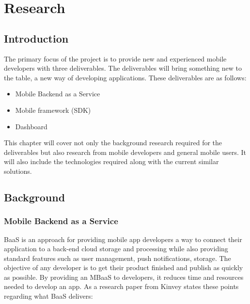 \chapter{Research}

\label{ch:background}

\section{Introduction}

The primary focus of the project is to provide new and experienced mobile developers with three deliverables. The deliverables will bring something new to the table, a new way of developing applications. These deliverables are as follows:

\begin{itemize}
  \item Mobile Backend as a Service
  \item Mobile framework (SDK)
  \item Dashboard
\end{itemize}

This chapter will cover not only the background research required for the deliverables but also research from mobile developers and general mobile users. It will also include the technologies required along with the current similar solutions.

\section{Background}

\subsection{Mobile Backend as a Service}

BaaS is an approach for providing mobile app developers a way to connect their application to a back-end cloud storage and processing while also providing standard features such as user management, push notifications, storage. The objective of any developer is to get their product finished and publish as quickly as possible. By providing an MBaaS to developers, it reduces time and resources needed to develop an app. As a research paper from Kinvey \cite{kinveywebsite} states these points regarding what BaaS delivers:

